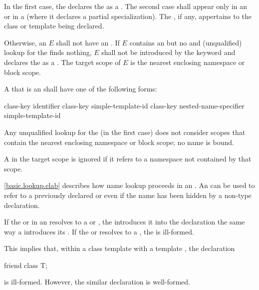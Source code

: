 In the first case,
the  declares
the  as a .
The second case shall appear only
in an  or
in a 
(where it declares a partial specialization).
The , if any, appertains
to the class or template being declared.

\pnum
Otherwise, an  $E$ shall not have
an .
If $E$ contains an 
but no  and
(unqualified) lookup for the  finds nothing,
$E$ shall not be introduced by the  keyword and
declares the  as a .
The target scope of $E$ is the nearest enclosing namespace or block scope.

\pnum
A 
that is an 
shall have one of the following forms:
\begin{ncsimplebnf}
class-key  identifier\br
class-key simple-template-id\br
class-key nested-name-specifier  simple-template-id
\end{ncsimplebnf}
Any unqualified lookup for the  (in the first case)
does not consider scopes that contain
the nearest enclosing namespace or block scope; no name is bound.
\begin{note}
A  in the target scope is ignored
if it refers to a namespace not contained by that scope.
\end{note}

\pnum
\begin{note}
\ref{basic.lookup.elab} describes how name lookup proceeds
in an .
An  can be used to refer to
a previously declared  or 
even if the name has been hidden by a non-type declaration.
\end{note}

\pnum
If the  or 
in an 
resolves to a  or
, the 
introduces it into the declaration the same way a
 introduces
its .
If the  or  resolves to a
,
the  is ill-formed.
\begin{note}
This implies that, within a class template with a template
 , the declaration
\begin{codeblock}
friend class T;
\end{codeblock}
is ill-formed. However, the similar declaration  is well-formed.
\end{note}

